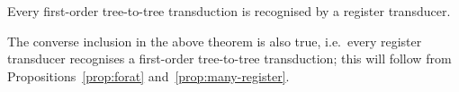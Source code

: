 \begin{theorem}\label{thm:stt}
    Every first-order tree-to-tree transduction is recognised by a  register transducer. 
\end{theorem}
The converse inclusion in the above theorem is also true, i.e.~every register transducer recognises a first-order tree-to-tree transduction; this will follow from Propositions~\ref{prop:forat} and~\ref{prop:many-register}. 





